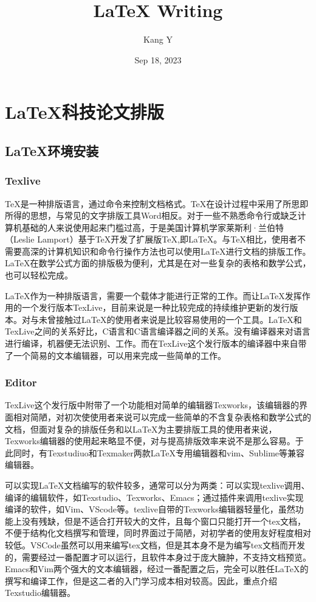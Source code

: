 \documentclass[12pt]{book}
\title{\LaTeX{} Writing}
\author{Kang Y}
\date{Sep 18, 2023}
\begin{document}
\maketitle
\frontmatter

\tableofcontents

\part{\LaTeX{}科技论文排版}

\chapter{\LaTeX{}环境安装}

\section{Texlive}

\TeX{}是一种排版语言，通过命令来控制文档格式。\TeX{}在设计过程中采用了所思即所得的思想，与常见的文字排版工具Word相反。对于一些不熟悉命令行或缺乏计算机基础的人来说使用起来门槛过高，于是美国计算机学家莱斯利·兰伯特（Leslie Lamport）基于\TeX{}开发了扩展版\TeX{},即\LaTeX{}。与\TeX{}相比，使用者不需要高深的计算机知识和命令行操作方法也可以使用\LaTeX{}进行文档的排版工作。\LaTeX{}在数学公式方面的排版极为便利，尤其是在对一些复杂的表格和数学公式，也可以轻松完成。

\LaTeX{}作为一种排版语言，需要一个载体才能进行正常的工作。而让\LaTeX{}发挥作用的一个发行版本TexLive，目前来说是一种比较完成的持续维护更新的发行版本。对与未曾接触过\LaTeX{}的使用者来说是比较容易使用的一个工具。\LaTeX{}和TexLive之间的关系好比，C语言和C语言编译器之间的关系。没有编译器来对语言进行编译，机器便无法识别、工作。而在TexLive这个发行版本的编译器中来自带了一个简易的文本编辑器，可以用来完成一些简单的工作。

\section{Editor}

TexLive这个发行版中附带了一个功能相对简单的编辑器Texworks，该编辑器的界面相对简陋，对初次使使用者来说可以完成一些简单的不含复杂表格和数学公式的文档，但面对复杂的排版任务和以\LaTeX{}为主要排版工具的使用者来说，Texworks编辑器的使用起来略显不便，对与提高排版效率来说不是那么容易。于此同时，有Texstudiuo和Texmaker两款\LaTeX{}专用编辑器和vim、Sublime等兼容编辑器。

可以实现\LaTeX{}文档编写的软件较多，通常可以分为两类：可以实现texlive调用、编译的编辑软件，如Texstudio、Texworks、Emacs；通过插件来调用texlive实现编译的软件，如Vim、VScode等。texlive自带的Texworks编辑器轻量化，虽然功能上没有残缺，但是不适合打开较大的文件，且每个窗口只能打开一个tex文档，不便于结构化文档撰写和管理，同时界面过于简陋，对初学者的使用友好程度相对较低。VSCode虽然可以用来编写tex文档，但是其本身不是为编写tex文档而开发的，需要经过一番配置才可以运行，且软件本身过于庞大臃肿，不支持文档预览。Emacs和Vim两个强大的文本编辑器，经过一番配置之后，完全可以胜任\LaTeX{}的撰写和编译工作，但是这二者的入门学习成本相对较高。因此，重点介绍Texstudio编辑器。
\end{document}
